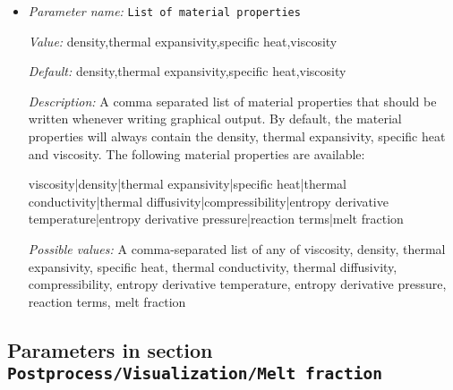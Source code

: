 \begin{itemize}
\item {\it Parameter name:} {\tt List of material properties}
\label{parameters:Postprocess/Visualization/Material properties/List of material properties}


{\it Value:} density,thermal expansivity,specific heat,viscosity


{\it Default:} density,thermal expansivity,specific heat,viscosity


{\it Description:} A comma separated list of material properties that should be written whenever writing graphical output. By default, the material properties will always contain the density, thermal expansivity, specific heat and viscosity. The following material properties are available:

viscosity|density|thermal expansivity|specific heat|thermal conductivity|thermal diffusivity|compressibility|entropy derivative temperature|entropy derivative pressure|reaction terms|melt fraction


{\it Possible values:} A comma-separated list of any of viscosity, density, thermal expansivity, specific heat, thermal conductivity, thermal diffusivity, compressibility, entropy derivative temperature, entropy derivative pressure, reaction terms, melt fraction
\end{itemize}

\subsection{Parameters in section \tt Postprocess/Visualization/Melt fraction}
\label{parameters:Postprocess/Visualization/Melt_20fraction}

